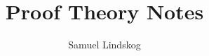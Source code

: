 \documentclass[nobib,notoc]{tufte-handout}
\begin{document}
\theoremstyle{definition}\newtheorem{defi}{Definition}[section]
\theoremstyle{definition}\newtheorem{thm}{Theorem}[section]
\theoremstyle{definition}\newtheorem{cor}{Corollary}
\theoremstyle{definition}\newtheorem{lem}{Lemma}[section]
\theoremstyle{remark}\newtheorem*{notat}{Notation}



\title{Proof Theory Notes}
\author{Samuel Lindskog}
\maketitle

\setcounter{section}{1}
\setcounter{tocdepth}{1}
\end{document}
